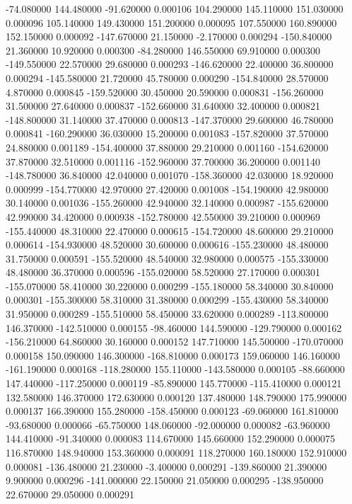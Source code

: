 -74.080000 144.480000 -91.620000 0.000106 
104.290000 145.110000 151.030000 0.000096 
105.140000 149.430000 151.200000 0.000095 
107.550000 160.890000 152.150000 0.000092 
-147.670000 21.150000 -2.170000 0.000294 
-150.840000 21.360000 10.920000 0.000300 
-84.280000 146.550000 69.910000 0.000300 
-149.550000 22.570000 29.680000 0.000293 
-146.620000 22.400000 36.800000 0.000294 
-145.580000 21.720000 45.780000 0.000290 
-154.840000 28.570000 4.870000 0.000845 
-159.520000 30.450000 20.590000 0.000831 
-156.260000 31.500000 27.640000 0.000837 
-152.660000 31.640000 32.400000 0.000821 
-148.800000 31.140000 37.470000 0.000813 
-147.370000 29.600000 46.780000 0.000841 
-160.290000 36.030000 15.200000 0.001083 
-157.820000 37.570000 24.880000 0.001189 
-154.400000 37.880000 29.210000 0.001160 
-154.620000 37.870000 32.510000 0.001116 
-152.960000 37.700000 36.200000 0.001140 
-148.780000 36.840000 42.040000 0.001070 
-158.360000 42.030000 18.920000 0.000999 
-154.770000 42.970000 27.420000 0.001008 
-154.190000 42.980000 30.140000 0.001036 
-155.260000 42.940000 32.140000 0.000987 
-155.620000 42.990000 34.420000 0.000938 
-152.780000 42.550000 39.210000 0.000969 
-155.440000 48.310000 22.470000 0.000615 
-154.720000 48.600000 29.210000 0.000614 
-154.930000 48.520000 30.600000 0.000616 
-155.230000 48.480000 31.750000 0.000591 
-155.520000 48.540000 32.980000 0.000575 
-155.330000 48.480000 36.370000 0.000596 
-155.020000 58.520000 27.170000 0.000301 
-155.070000 58.410000 30.220000 0.000299 
-155.180000 58.340000 30.840000 0.000301 
-155.300000 58.310000 31.380000 0.000299 
-155.430000 58.340000 31.950000 0.000289 
-155.510000 58.450000 33.620000 0.000289 
-113.800000 146.370000 -142.510000 0.000155 
-98.460000 144.590000 -129.790000 0.000162 
-156.210000 64.860000 30.160000 0.000152 
147.710000 145.500000 -170.070000 0.000158 
150.090000 146.300000 -168.810000 0.000173 
159.060000 146.160000 -161.190000 0.000168 
-118.280000 155.110000 -143.580000 0.000105 
-88.660000 147.440000 -117.250000 0.000119 
-85.890000 145.770000 -115.410000 0.000121 
132.580000 146.370000 172.630000 0.000120 
137.480000 148.790000 175.990000 0.000137 
166.390000 155.280000 -158.450000 0.000123 
-69.060000 161.810000 -93.680000 0.000066 
-65.750000 148.060000 -92.000000 0.000082 
-63.960000 144.410000 -91.340000 0.000083 
114.670000 145.660000 152.290000 0.000075 
116.870000 148.940000 153.360000 0.000091 
118.270000 160.180000 152.910000 0.000081 
-136.480000 21.230000 -3.400000 0.000291 
-139.860000 21.390000 9.900000 0.000296 
-141.000000 22.150000 21.050000 0.000295 
-138.950000 22.670000 29.050000 0.000291 
